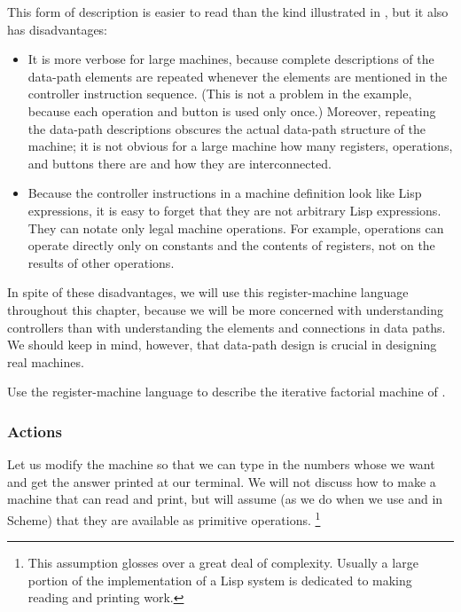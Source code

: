 This form of description is easier to read than the kind illustrated in , but it also has disadvantages:
\begin{itemize}

	\item
		It is more verbose for large machines, because complete descriptions of the data-path elements are repeated whenever the elements are mentioned in the controller instruction sequence.
		(This is not a problem in the  example, because each operation and button is used only once.)
		Moreover, repeating the data-path descriptions obscures the actual data-path structure of the machine;
		it is not obvious for a large machine how many registers, operations, and buttons there are and how they are interconnected.

	\item
		Because the controller instructions in a machine definition look like Lisp expressions, it is easy to forget that they are not arbitrary Lisp expressions.
		They can notate only legal machine operations.
		For example, operations can operate directly only on constants and the contents of registers, not on the  results of other operations.

\end{itemize}

In spite of these disadvantages, we will use this register-machine language throughout this chapter, because we will be more concerned with understanding controllers than with understanding the elements and connections in data paths.
We should keep in mind, however, that data-path design is crucial in designing real machines.



\begin{exercise}
	\label{Exercise 5.2}
	Use the register-machine language to describe the iterative factorial machine of .
\end{exercise}



\subsubsection*{Actions}

Let us modify the  machine so that we can type in the numbers whose  we want and get the answer printed at our terminal.
We will not discuss how to make a machine that can read and print, but will assume (as we do when we use  and  in Scheme) that they are available as primitive operations.%
\footnote{
	This assumption glosses over a great deal of complexity.
	Usually a large portion of the implementation of a Lisp system is dedicated to making reading and printing work.
}

